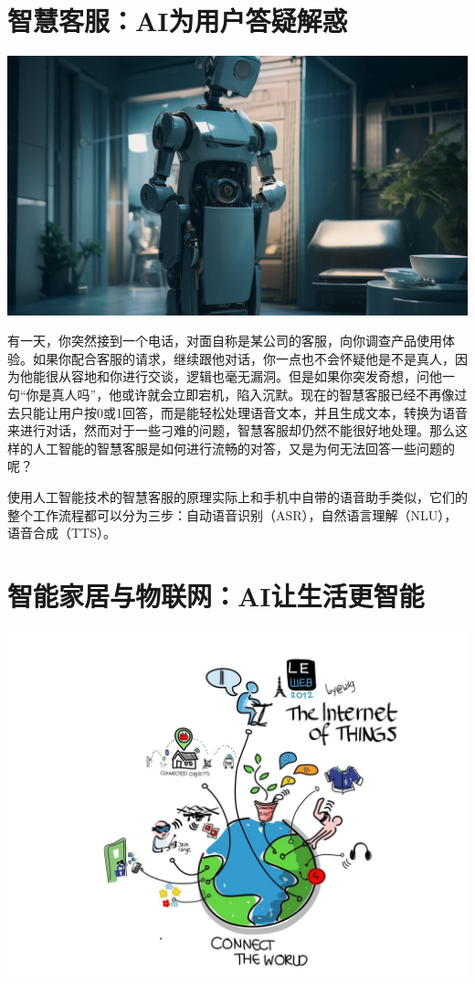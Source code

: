 \section[智慧客服]{智慧客服：AI为用户答疑解惑}

\begin{marginfigure}
\includegraphics{images/Internet_07.png}
\end{marginfigure}

有一天，你突然接到一个电话，对面自称是某公司的客服，向你调查产品使用体验。如果你配合客服的请求，继续跟他对话，你一点也不会怀疑他是不是真人，因为他能很从容地和你进行交谈，逻辑也毫无漏洞。但是如果你突发奇想，问他一句“你是真人吗”，他或许就会立即宕机，陷入沉默。现在的智慧客服已经不再像过去只能让用户按0或1回答，而是能轻松处理语音文本，并且生成文本，转换为语音来进行对话，然而对于一些刁难的问题，智慧客服却仍然不能很好地处理。那么这样的人工智能的智慧客服是如何进行流畅的对答，又是为何无法回答一些问题的呢？

使用人工智能技术的智慧客服的原理实际上和手机中自带的语音助手类似，它们的整个工作流程都可以分为三步：自动语音识别（ASR），自然语言理解（NLU），语音合成（TTS）。

\section[智能家居与物联网]{智能家居与物联网：AI让生活更智能}

\begin{marginfigure}
\includegraphics{images/Internet_08.jpg}
\end{marginfigure}

